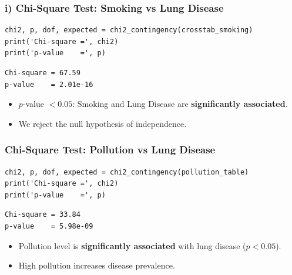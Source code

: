 \documentclass[12pt,a4paper]{article}
\begin{document}
\subsubsection{i) Chi-Square Test: Smoking vs Lung Disease}

\begin{lstlisting}
chi2, p, dof, expected = chi2_contingency(crosstab_smoking)
print('Chi-square =', chi2)
print('p-value    =', p)
\end{lstlisting}

\begin{outputbox}
\begin{verbatim}
Chi-square = 67.59
p-value    = 2.01e-16
\end{verbatim}
\end{outputbox}

\begin{interpbox}
\begin{itemize}[noitemsep]
  \item $p$-value $< 0.05$: Smoking and Lung Disease are \textbf{significantly associated}.
  \item We reject the null hypothesis of independence.
\end{itemize}
\end{interpbox}

\subsubsection{Chi-Square Test: Pollution vs Lung Disease}

\begin{lstlisting}
chi2, p, dof, expected = chi2_contingency(pollution_table)
print('Chi-square =', chi2)
print('p-value    =', p)
\end{lstlisting}

\begin{outputbox}
\begin{verbatim}
Chi-square = 33.84
p-value    = 5.98e-09
\end{verbatim}
\end{outputbox}

\begin{interpbox}
\begin{itemize}[noitemsep]
  \item Pollution level is \textbf{significantly associated} with lung disease ($p < 0.05$).
  \item High pollution increases disease prevalence.
\end{itemize}
\end{interpbox}
\end{document}
